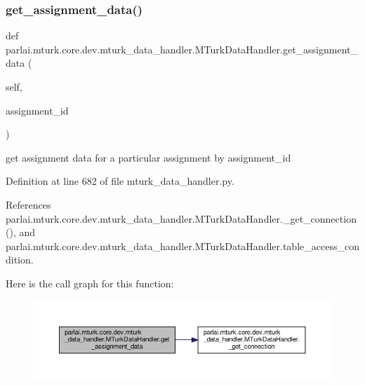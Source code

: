 \subsubsection{\texorpdfstring{get\+\_\+assignment\+\_\+data()}{get\_assignment\_data()}}
{\footnotesize\ttfamily def parlai.\+mturk.\+core.\+dev.\+mturk\+\_\+data\+\_\+handler.\+M\+Turk\+Data\+Handler.\+get\+\_\+assignment\+\_\+data (\begin{DoxyParamCaption}\item[{}]{self,  }\item[{}]{assignment\+\_\+id }\end{DoxyParamCaption})}

\begin{DoxyVerb}get assignment data for a particular assignment by assignment_id\end{DoxyVerb}
 

Definition at line 682 of file mturk\+\_\+data\+\_\+handler.\+py.



References parlai.\+mturk.\+core.\+dev.\+mturk\+\_\+data\+\_\+handler.\+M\+Turk\+Data\+Handler.\+\_\+get\+\_\+connection(), and parlai.\+mturk.\+core.\+dev.\+mturk\+\_\+data\+\_\+handler.\+M\+Turk\+Data\+Handler.\+table\+\_\+access\+\_\+condition.

Here is the call graph for this function\+:
\nopagebreak
\begin{figure}[H]
\begin{center}
\leavevmode
\includegraphics[width=350pt]{classparlai_1_1mturk_1_1core_1_1dev_1_1mturk__data__handler_1_1MTurkDataHandler_a70ee72567e0c94eea130cdee21549ada_cgraph}
\end{center}
\end{figure}
\mbox{\label{classparlai_1_1mturk_1_1core_1_1dev_1_1mturk__data__handler_1_1MTurkDataHandler_aa3f132c04075d005d6639b938414ac0f}} 
